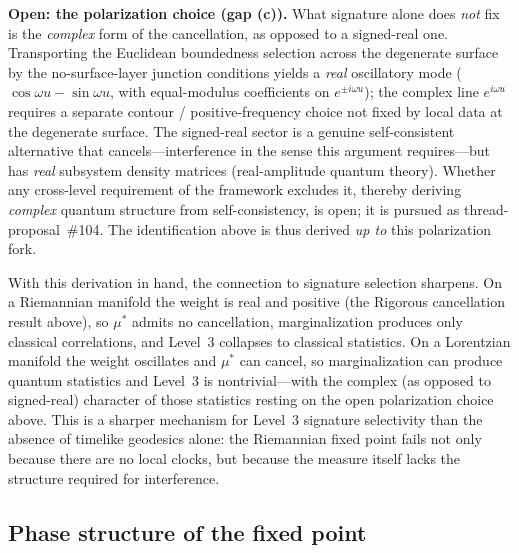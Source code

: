 \documentclass[12pt,a4paper]{article}
\theoremstyle{definition}
\theoremstyle{remark}
\begin{document}
\medskip\noindent\textbf{Open: the polarization choice (gap (c)).} What
signature alone does \emph{not} fix is the \emph{complex} form of the
cancellation, as opposed to a signed-real one. Transporting the Euclidean
boundedness selection across the degenerate surface by the
no-surface-layer junction conditions yields a \emph{real} oscillatory
mode ($\cos\omega u - \sin\omega u$, with equal-modulus coefficients on
$e^{\pm i\omega u}$); the complex line $e^{i\omega u}$ requires a separate
contour / positive-frequency choice not fixed by local data at the
degenerate surface. The signed-real sector is a genuine self-consistent
alternative that cancels---interference in the sense this argument
requires---but has \emph{real} subsystem density matrices
(real-amplitude quantum theory). Whether any cross-level requirement of
the framework excludes it, thereby deriving \emph{complex} quantum
structure from self-consistency, is open; it is pursued as
thread-proposal~\#104. The identification above is thus derived \emph{up
to} this polarization fork.

\medskip
With this derivation in hand, the connection to signature selection
sharpens. On a Riemannian manifold the weight is real and positive
(the Rigorous cancellation result above), so $\mu^*$ admits no
cancellation,
marginalization produces only classical correlations, and Level~3
collapses to classical statistics. On a Lorentzian manifold the weight
oscillates and $\mu^*$ can cancel, so marginalization can produce
quantum statistics and Level~3 is nontrivial---with the complex (as
opposed to signed-real) character of those statistics resting on the
open polarization choice above. This is a sharper mechanism for Level~3
signature selectivity than the absence of timelike geodesics alone: the
Riemannian fixed point fails not only because there are no local clocks,
but because the measure itself lacks the structure required for
interference.

\subsection{Phase structure of the fixed point}
\label{sec:phase_structure}
\end{document}
